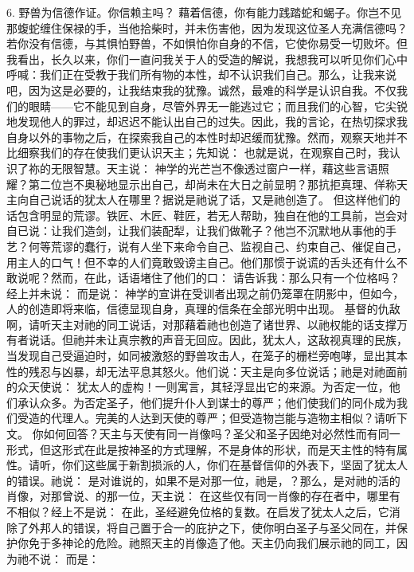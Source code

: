 6. 野兽为信德作证。你信赖主吗？ 藉着信德，你有能力践踏蛇和蝎子。你岂不见那蝮蛇缠住保禄的手，当他拾柴时，并未伤害他，因为发现这位圣人充满信德吗？若你没有信德，与其惧怕野兽，不如惧怕你自身的不信，它使你易受一切败坏。但我看出，长久以来，你们一直问我关于人的受造的解说，我想我可以听见你们心中呼喊：我们正在受教于我们所有物的本性，却不认识我们自己。那么，让我来说吧，因为这是必要的，让我结束我的犹豫。诚然，最难的科学是认识自我。不仅我们的眼睛——它不能见到自身，尽管外界无一能逃过它；而且我们的心智，它尖锐地发现他人的罪过，却迟迟不能认出自己的过失。因此，我的言论，在热切探求我自身以外的事物之后，在探索我自己的本性时却迟缓而犹豫。然而，观察天地并不比细察我们的存在使我们更认识天主；先知说： 也就是说，在观察自己时，我认识了祢的无限智慧。天主说：  神学的光芒岂不像透过窗户一样，藉这些言语照耀？第二位岂不奥秘地显示出自己，却尚未在大日之前显明？那抗拒真理、佯称天主向自己说话的犹太人在哪里？据说是祂说了话，又是祂创造了。 但这样他们的话包含明显的荒谬。铁匠、木匠、鞋匠，若无人帮助，独自在他的工具前，岂会对自已说：让我们造剑，让我们装配犁，让我们做靴子？他岂不沉默地从事他的手艺？何等荒谬的蠢行，说有人坐下来命令自己、监视自己、约束自己、催促自己，用主人的口气！但不幸的人们竟敢毁谤主自己。他们那惯于说谎的舌头还有什么不敢说呢？然而，在此，话语堵住了他们的口： 请告诉我：那么只有一个位格吗？经上并未说： 而是说： 神学的宣讲在受训者出现之前仍笼罩在阴影中，但如今，人的创造即将来临，信德显现自身，真理的信条在全部光明中出现。 基督的仇敌啊，请听天主对祂的同工说话，对那藉着祂也创造了诸世界、以祂权能的话支撑万有者说话。但祂并未让真宗教的声音无回应。因此，犹太人，这敌视真理的民族，当发现自己受逼迫时，如同被激怒的野兽攻击人，在笼子的栅栏旁咆哮，显出其本性的残忍与凶暴，却无法平息其怒火。他们说：天主是向多位说话；祂是对祂面前的众天使说： 犹太人的虚构！一则寓言，其轻浮显出它的来源。为否定一位，他们承认众多。为否定圣子，他们提升仆人到谋士的尊严；他们使我们的同仆成为我们受造的代理人。完美的人达到天使的尊严；但受造物岂能与造物主相似？请听下文。 你如何回答？天主与天使有同一肖像吗？圣父和圣子因绝对必然性而有同一形式，但这形式在此是按神圣的方式理解，不是身体的形状，而是天主性的特有属性。请听，你们这些属于新割损派的人，你们在基督信仰的外表下，坚固了犹太人的错误。祂说： 是对谁说的，如果不是对那一位，祂是，？那么，是对祂的活的肖像，对那曾说、的那一位，天主说： 在这些仅有同一肖像的存在者中，哪里有不相似？经上不是说： 在此，圣经避免位格的复数。在启发了犹太人之后，它消除了外邦人的错误，将自己置于合一的庇护之下，使你明白圣子与圣父同在，并保护你免于多神论的危险。祂照天主的肖像造了他。天主仍向我们展示祂的同工，因为祂不说： 而是：\par

